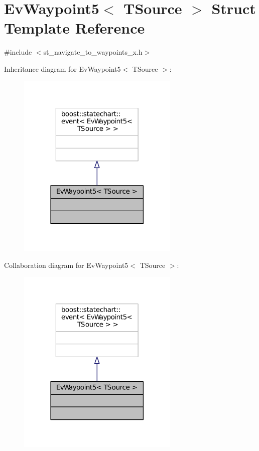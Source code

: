 \hypertarget{structEvWaypoint5}{}\section{Ev\+Waypoint5$<$ T\+Source $>$ Struct Template Reference}
\label{structEvWaypoint5}


{\ttfamily \#include $<$st\+\_\+navigate\+\_\+to\+\_\+waypoints\+\_\+x.\+h$>$}



Inheritance diagram for Ev\+Waypoint5$<$ T\+Source $>$\+:
\nopagebreak
\begin{figure}[H]
\begin{center}
\leavevmode
\includegraphics[width=218pt]{structEvWaypoint5__inherit__graph}
\end{center}
\end{figure}


Collaboration diagram for Ev\+Waypoint5$<$ T\+Source $>$\+:
\nopagebreak
\begin{figure}[H]
\begin{center}
\leavevmode
\includegraphics[width=218pt]{structEvWaypoint5__coll__graph}
\end{center}
\end{figure}



